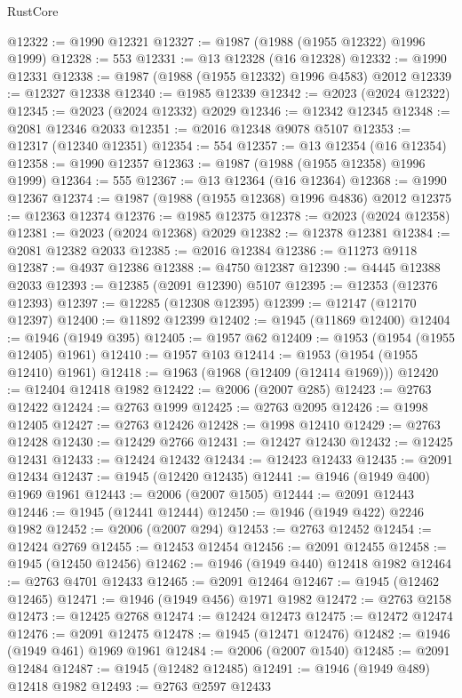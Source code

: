 \begin{lexlean}{RustCore}
\begin{coremodule}
@12322 := @1990 @12321
@12327 := @1987 (@1988 (@1955 @12322) @1996 @1999)
@12328 := 553
@12331 := @13 @12328 (@16 @12328)
@12332 := @1990 @12331
@12338 := @1987 (@1988 (@1955 @12332) @1996 @4583) @2012
@12339 := @12327 @12338
@12340 := @1985 @12339
@12342 := @2023 (@2024 @12322)
@12345 := @2023 (@2024 @12332) @2029
@12346 := @12342 @12345
@12348 := @2081 @12346 @2033
@12351 := @2016 @12348 @9078 @5107
@12353 := @12317 (@12340 @12351)
@12354 := 554
@12357 := @13 @12354 (@16 @12354)
@12358 := @1990 @12357
@12363 := @1987 (@1988 (@1955 @12358) @1996 @1999)
@12364 := 555
@12367 := @13 @12364 (@16 @12364)
@12368 := @1990 @12367
@12374 := @1987 (@1988 (@1955 @12368) @1996 @4836) @2012
@12375 := @12363 @12374
@12376 := @1985 @12375
@12378 := @2023 (@2024 @12358)
@12381 := @2023 (@2024 @12368) @2029
@12382 := @12378 @12381
@12384 := @2081 @12382 @2033
@12385 := @2016 @12384
@12386 := @11273 @9118
@12387 := @4937 @12386
@12388 := @4750 @12387
@12390 := @4445 @12388 @2033
@12393 := @12385 (@2091 @12390) @5107
@12395 := @12353 (@12376 @12393)
@12397 := @12285 (@12308 @12395)
@12399 := @12147 (@12170 @12397)
@12400 := @11892 @12399
@12402 := @1945 (@11869 @12400)
@12404 := @1946 (@1949 @395)
@12405 := @1957 @62
@12409 := @1953 (@1954 (@1955 @12405) @1961)
@12410 := @1957 @103
@12414 := @1953 (@1954 (@1955 @12410) @1961)
@12418 := @1963 (@1968 (@12409 (@12414 @1969)))
@12420 := @12404 @12418 @1982
@12422 := @2006 (@2007 @285)
@12423 := @2763 @12422
@12424 := @2763 @1999
@12425 := @2763 @2095
@12426 := @1998 @12405
@12427 := @2763 @12426
@12428 := @1998 @12410
@12429 := @2763 @12428
@12430 := @12429 @2766
@12431 := @12427 @12430
@12432 := @12425 @12431
@12433 := @12424 @12432
@12434 := @12423 @12433
@12435 := @2091 @12434
@12437 := @1945 (@12420 @12435)
@12441 := @1946 (@1949 @400) @1969 @1961
@12443 := @2006 (@2007 @1505)
@12444 := @2091 @12443
@12446 := @1945 (@12441 @12444)
@12450 := @1946 (@1949 @422) @2246 @1982
@12452 := @2006 (@2007 @294)
@12453 := @2763 @12452
@12454 := @12424 @2769
@12455 := @12453 @12454
@12456 := @2091 @12455
@12458 := @1945 (@12450 @12456)
@12462 := @1946 (@1949 @440) @12418 @1982
@12464 := @2763 @4701 @12433
@12465 := @2091 @12464
@12467 := @1945 (@12462 @12465)
@12471 := @1946 (@1949 @456) @1971 @1982
@12472 := @2763 @2158
@12473 := @12425 @2768
@12474 := @12424 @12473
@12475 := @12472 @12474
@12476 := @2091 @12475
@12478 := @1945 (@12471 @12476)
@12482 := @1946 (@1949 @461) @1969 @1961
@12484 := @2006 (@2007 @1540)
@12485 := @2091 @12484
@12487 := @1945 (@12482 @12485)
@12491 := @1946 (@1949 @489) @12418 @1982
@12493 := @2763 @2597 @12433

\end{coremodule}
\end{lexlean}
